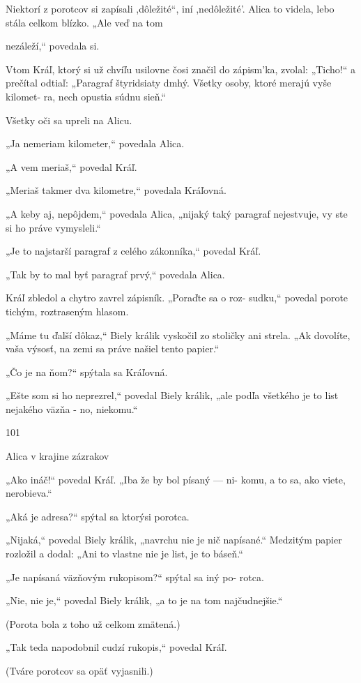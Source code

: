 \documentclass[12pt]{article}
\begin{document}
\begin{Parallel}[p]{}{}
{{Niektorí z porotcov si zapísali ,dôležité“, iní ,nedôležité'.
Alica to videla, lebo stála celkom blízko. „Ale veď na tom

nezáleží,“ povedala si.

Vtom Kráľ, ktorý si už chvíľu usilovne čosi značil do
zápism'ka, zvolal: „Ticho!“ a prečítal odtiaľ: „Paragraf
štyridsiaty dmhý. Všetky osoby, ktoré merajú vyše kilomet-
ra, nech opustia súdnu sieň.“

Všetky oči sa upreli na Alicu.

„Ja nemeriam kilometer,“ povedala Alica.

„A vem meriaš,“ povedal Kráľ.

„Meriaš takmer dva kilometre,“ povedala Kráľovná.

„A keby aj, nepôjdem,“ povedala Alica, „nijaký taký
paragraf nejestvuje, vy ste si ho práve vymysleli.“

„Je to najstarší paragraf z celého zákonníka,“ povedal
Kráľ.

„Tak by to mal byť paragraf prvý,“ povedala Alica.

Kráľ zbledol a chytro zavrel zápisník. „Poraďte sa o roz-
sudku,“ povedal porote tichým, roztraseným hlasom.

„Máme tu ďalší dôkaz,“ Biely králik vyskočil zo stoličky
ani strela. „Ak dovolíte, vaša výsosť, na zemi sa práve našiel
tento papier.“

„Čo je na ňom?“ spýtala sa Kráľovná.

„Ešte som si ho neprezrel,“ povedal Biely králik, „ale
podľa všetkého je to list nejakého väzňa - no, niekomu.“

101

Alica v krajine zázrakov

„Ako ináč!“ povedal Kráľ. „Iba že by bol písaný — ni-
komu, a to sa, ako viete, nerobieva.“

„Aká je adresa?“ spýtal sa ktorýsi porotca.

„Nijaká,“ povedal Biely králik, „navrchu nie je nič
napísané.“ Medzitým papier rozložil a dodal: „Ani to
vlastne nie je list, je to báseň.“

„Je napísaná väzňovým rukopisom?“ spýtal sa iný po-
rotca.

„Nie, nie je,“ povedal Biely králik, „a to je na tom
najčudnejšie.“

(Porota bola z toho už celkom zmätená.)

„Tak teda napodobnil cudzí rukopis,“ povedal Kráľ.

(Tváre porotcov sa opäť vyjasnili.)

}}
\end{Parallel}
\end{document}
